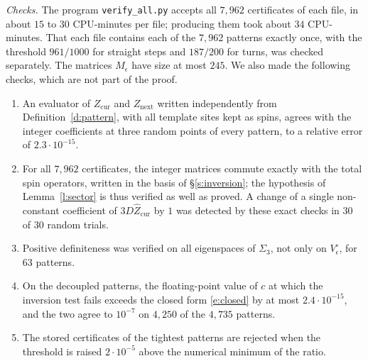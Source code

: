 \emph{Checks.} The program \texttt{verify\_all.py} accepts all $7{,}962$ certificates of each file, in about $15$ to $30$ CPU-minutes per file; producing them took about $34$ CPU-minutes. That each file contains each of the $7{,}962$ patterns exactly once, with the threshold $961/1000$ for straight steps and $187/200$ for turns, was checked separately. The matrices $M_\epsilon$ have size at most $245$. We also made the following checks, which are not part of the proof.
\begin{enumerate}
\item An evaluator of $Z_{\mathrm{cur}}$ and $Z_{\mathrm{next}}$ written independently from Definition~\ref{d:pattern}, with all template sites kept as spins, agrees with the integer coefficients at three random points of every pattern, to a relative error of $2.3 \cdot 10^{-15}$.
\item For all $7{,}962$ certificates, the integer matrices commute exactly with the total spin operators, written in the basis of \S\ref{s:inversion}; the hypothesis of Lemma~\ref{l:sector} is thus verified as well as proved. A change of a single non-constant coefficient of $3 D \hat Z_{\mathrm{cur}}$ by $1$ was detected by these exact checks in $30$ of $30$ random trials.
\item Positive definiteness was verified on all eigenspaces of $\Sigma_3$, not only on $V_\epsilon^{\circ}$, for $63$ patterns.
\item On the decoupled patterns, the floating-point value of $c$ at which the inversion test fails exceeds the closed form \eqref{e:closed} by at most $2.4 \cdot 10^{-15}$, and the two agree to $10^{-7}$ on $4{,}250$ of the $4{,}735$ patterns.
\item The stored certificates of the tightest patterns are rejected when the threshold is raised $2 \cdot 10^{-5}$ above the numerical minimum of the ratio.
\end{enumerate}
